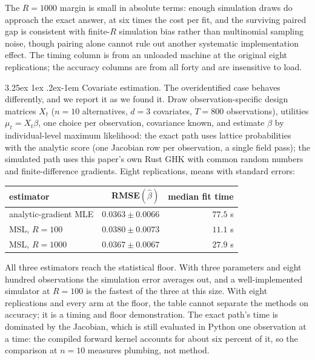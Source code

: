 \documentclass[11pt]{article}
\makeatletter
\renewcommand\paragraph{\@startsection{paragraph}{4}{\z@}%
  {3.25ex \@plus1ex \@minus.2ex}{-1em}%
  {\normalfont\normalsize\itshape}}
\makeatother
\begin{document}
The $R=1000$ margin is small in absolute terms: enough simulation draws do approach the exact answer,
at six times the cost per fit, and the surviving paired gap is
consistent with finite-$R$ simulation bias rather than multinomial
sampling noise, though pairing alone cannot rule out another systematic
implementation effect. The timing column is from
an unloaded machine at the original eight replications; the accuracy
columns are from all forty and are insensitive to load.

\paragraph{Covariate estimation.} The overidentified case behaves
differently, and we report it as we found it. Draw observation-specific
design matrices $X_t$ ($n=10$ alternatives, $d=3$ covariates,
$T=800$ observations), utilities $\mu_t=X_t\beta$, one choice per
observation, covariance known, and estimate $\beta$ by individual-level
maximum likelihood: the exact path uses lattice probabilities with the
analytic score (one Jacobian row per observation, a single field pass);
the simulated path uses this paper's own Rust GHK with common random
numbers and finite-difference gradients. Eight replications, means with
standard errors:

\begin{center}\small
\begin{tabular}{lrr}
\toprule
estimator & RMSE$(\hat\beta)$ & median fit time \\
\midrule
analytic-gradient MLE & $0.0363\pm0.0066$ & $77.5$ s \\
MSL, $R=100$ & $0.0380\pm0.0073$ & $11.1$ s \\
MSL, $R=1000$ & $0.0367\pm0.0067$ & $27.9$ s \\
\bottomrule
\end{tabular}
\end{center}

\noindent All three estimators reach the statistical floor. With three
parameters and eight hundred observations the simulation error averages
out, and a well-implemented simulator at $R=100$ is the fastest of the
three at this size. With eight replications and every arm at the floor,
the table cannot separate the methods on accuracy; it is a timing and
floor demonstration. The exact path's time is dominated by the Jacobian,
which is still evaluated in Python one observation at a time: the
compiled forward kernel accounts for about six percent of it, so the
comparison at $n=10$ measures plumbing, not method.
\end{document}
